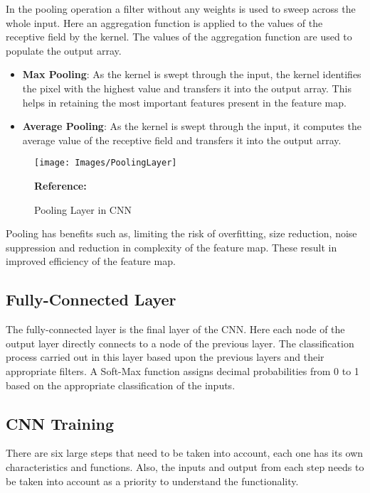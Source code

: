 In the pooling operation a filter without any weights is used to sweep across the whole input. Here an aggregation function is applied to the values of the receptive field by the kernel. The values of the aggregation function are used to populate the output array. \autocite{IBM:2020}

\begin{itemize}
	\item \textbf{Max Pooling}:	As the kernel is swept through the input, the kernel identifies the pixel with the highest value and transfers it into the output array. This helps in retaining the most important features present in the feature map.
	\item \textbf{Average Pooling}:	As the kernel is swept through the input, it computes the average value of the receptive field and transfers it into the output array.
\end{itemize}

\begin{figure}  [H]
	\begin{center}
		\texttt{[image: Images/PoolingLayer]}
		\caption{Pooling Layer in CNN} 
		\label{Pooling Layer in CNN}
		\footnotesize \textbf{Reference:} \autocite{KE:2022}
	\end{center}
\end{figure}

Pooling has benefits such as, limiting the risk of overfitting, size reduction, noise suppression and reduction in complexity of the feature map. These result in improved efficiency of the feature map.\\

\subsection{Fully-Connected Layer}
The fully-connected layer is the final layer of the CNN. Here each node of the output layer directly connects to a node of the previous layer. The classification process carried out in this layer based upon the previous layers and their appropriate filters. A Soft-Max function assigns decimal probabilities from 0 to 1 based on the appropriate classification of the inputs. \autocite{IBM:2020}

\subsection{CNN Training}
There are six large steps that need to be taken into account, each one has its own characteristics and functions. Also, the inputs and output from each step needs to be taken into account as a priority to understand the functionality. \\

